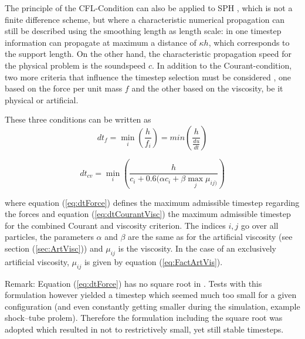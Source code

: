 \documentclass{report}
\begin{document}
The principle of the CFL-Condition can also be applied to SPH \cite{Monaghan1989}, which is not a finite difference scheme, but where a characteristic numerical propagation can still be described using the smoothing length as length scale: in one timestep information can propagate at maximum a distance of $\kappa h$, which corresponds to the support length. On the other hand, the characteristic propagation speed for the physical problem is the soundspeed $c$. 
In addition to the Courant-condition, two more criteria that influence the timestep selection must be considered \cite{Monaghan1992}, one based on the force per unit mass $f$ and the other based on the viscosity, be it physical or artificial.

These three conditions can be written as \cite{Monaghan1989,Monaghan1992}
\begin{equation}
\label{eq:dtForce}
 dt_f=\min_i\left(\frac{h}{f_i}\right)=min\left(\frac{h}{\frac{du}{dt}}\right)
\end{equation}

\begin{equation}
\label{eq:dtCourantVisc}
 dt_{cv}=\min_i\left(\frac{h}{c_i+0.6(\alpha c_i+\beta \max_j \mu_{ij)}}\right)
\end{equation}

where equation (\ref{eq:dtForce}) defines the maximum admissible timestep regarding the forces and equation (\ref{eq:dtCourantVisc}) the maximum admissible timestep for the combined Courant and viscosity criterion. The indices $i,j$ go over all particles, the parameters $\alpha$ and $\beta$ are the same as for the artificial viscosity (see section (\ref{sec:ArtVisc})) and $\mu_{ij}$ is the viscosity. In the case of an exclusively artificial viscosity, $\mu_{ij}$ is given by equation (\ref{eq:FactArtVis}).

Remark: Equation (\ref{eq:dtForce}) has no square root in \cite{Monaghan1992}. Tests with this formulation however yielded a timestep which seemed much too small for a given configuration (and even constantly getting smaller during the simulation, example shock--tube prolem). Therefore the formulation including the square root \cite{Monaghan1989} was adopted which resulted in not to restrictively small, yet still stable timesteps.

\end{document}
